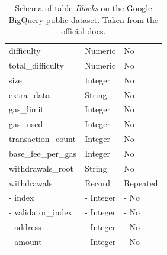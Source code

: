 \begin{table}[H]
\begin{tabular}  { m{6cm} m{3cm} m{3cm} }
    difficulty & Numeric & No\\ %
    total\_difficulty & Numeric & No\\ %
    size & Integer & No\\ %
    extra\_data & String & No\\ %
    gas\_limit & Integer & No\\ %
    gas\_used & Integer & No\\ %
    transaction\_count & Integer & No\\ %
    base\_fee\_per\_gas & Integer & No\\ %
    withdrawals\_root & String & No\\ %
    withdrawals & Record & Repeated\\ %
    \quad- index & \quad- Integer & \quad- No\\ %
    \quad- validator\_index & \quad- Integer & \quad- No\\ %
    \quad- address & \quad- Integer & \quad- No\\ %
    \quad- amount & \quad- Integer & \quad- No\\ %
    \bottomrule
\end{tabular}
\caption[Google BigQuery \texttt{Blocks} table]{Schema of table \textit{Blocks} on the Google BigQuery public dataset. Taken from the official docs.}
\label{table:bigquery-blocks}
\end{table}

